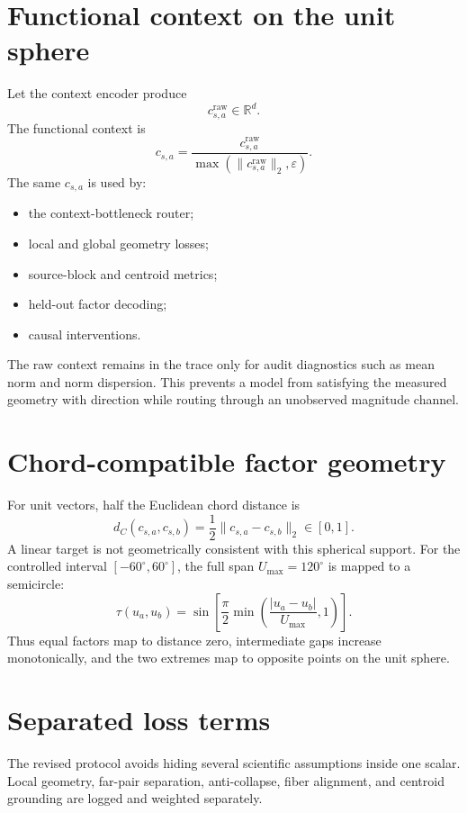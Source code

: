 \documentclass[11pt]{article}
\begin{document}
\section{Functional context on the unit sphere}
Let the context encoder produce
\[
c^{\mathrm{raw}}_{s,a}\in\mathbb{R}^{d}.
\]
The functional context is
\begin{equation}
 c_{s,a}=
 \frac{c^{\mathrm{raw}}_{s,a}}
 {\max(\lVert c^{\mathrm{raw}}_{s,a}\rVert_2,\varepsilon)}.
 \label{eq:normalization}
\end{equation}
The same $c_{s,a}$ is used by:
\begin{itemize}
    \item the context-bottleneck router;
    \item local and global geometry losses;
    \item source-block and centroid metrics;
    \item held-out factor decoding;
    \item causal interventions.
\end{itemize}
The raw context remains in the trace only for audit diagnostics such as mean norm and norm dispersion. This prevents a model from satisfying the measured geometry with direction while routing through an unobserved magnitude channel.

\section{Chord-compatible factor geometry}
For unit vectors, half the Euclidean chord distance is
\begin{equation}
 d_C(c_{s,a},c_{s,b})=
 \frac{1}{2}\lVert c_{s,a}-c_{s,b}\rVert_2\in[0,1].
 \label{eq:halfchord}
\end{equation}
A linear target is not geometrically consistent with this spherical support. For the controlled interval $[-60^\circ,60^\circ]$, the full span $U_{\max}=120^\circ$ is mapped to a semicircle:
\begin{equation}
 \tau(u_a,u_b)=
 \sin\!\left[
 \frac{\pi}{2}
 \min\!\left(
 \frac{|u_a-u_b|}{U_{\max}},1
 \right)
 \right].
 \label{eq:target}
\end{equation}
Thus equal factors map to distance zero, intermediate gaps increase monotonically, and the two extremes map to opposite points on the unit sphere.

\section{Separated loss terms}
The revised protocol avoids hiding several scientific assumptions inside one scalar. Local geometry, far-pair separation, anti-collapse, fiber alignment, and centroid grounding are logged and weighted separately.
\end{document}
